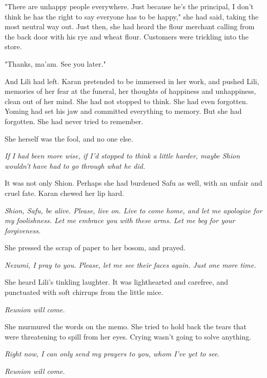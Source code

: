 "There are unhappy people everywhere. Just because he's the principal, I
don't think he has the right to say everyone has to be happy," she had
said, taking the most neutral way out. Just then, she had heard the
flour merchant calling from the back door with his rye and wheat flour.
Customers were trickling into the store.

"Thanks, ma'am. See you later."

And Lili had left. Karan pretended to be immersed in her work, and
pushed Lili, memories of her fear at the funeral, her thoughts of
happiness and unhappiness, clean out of her mind. She had not stopped to
think. She had even forgotten. Yoming had set his jaw and committed
everything to memory. But she had forgotten. She had never tried to
remember.

She herself was the fool, and no one else.

\emph{If I had been more wise, if I'd stopped to think a little harder, maybe
Shion wouldn't have had to go through what he did.}

It was not only Shion. Perhaps she had burdened Safu as well, with an
unfair and cruel fate. Karan chewed her lip hard.

\emph{Shion, Safu, be alive. Please, live on. Live to come home, and let me
apologize for my foolishness. Let me embrace you with these arms. Let me
beg for your forgiveness.}

She pressed the scrap of paper to her bosom, and prayed.


\emph{Nezumi, I pray to you. Please, let me see their faces again. Just one
more time.}

She heard Lili's tinkling laughter. It was lighthearted and carefree,
and punctuated with soft chirrups from the little mice.

\emph{Reunion will come.}

She murmured the words on the memo. She tried to hold back the tears
that were threatening to spill from her eyes. Crying wasn't going to
solve anything.

\emph{Right now, I can only send my prayers to you, whom I've yet to see.}

\emph{Reunion will come.}